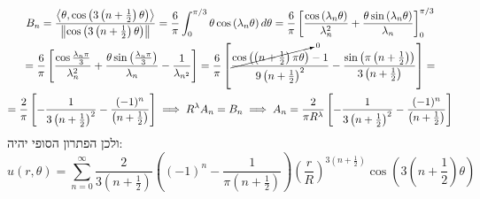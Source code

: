 \documentclass{tstextbook}
\begin{document}
\begin{gather*} B_{n}=\frac{\left\langle  \theta, \cos \left( 3\left( n+\frac{1}{2} \right)\theta \right)  \right\rangle }{\left\lVert   \cos \left( 3\left( n+\frac{1}{2} \right)\theta  \right)  \right\rVert }= \frac{6}{\pi}\int_{0}^{\pi/3}\theta \cos\left( \lambda_{n}\theta \right)d\theta= \frac{6}{\pi}\left[ \frac{\cos\left( \lambda_{n} \theta \right)}{\lambda_{n}^2}+\frac{\theta \sin\left( \lambda_{n} \theta \right)}{\lambda_{n}} \right]_{0}^{\pi/3} \\=\frac{6}{\pi}\left[ \frac{\cos \frac{\lambda_{n}\pi}{3}}{\lambda_{n}^2}+\frac{\theta \sin\left( \frac{\lambda_{n}\pi}{3} \right)}{\lambda_{n}} -\frac{1}{\lambda_{n^2}}\right]=  \frac{6}{\pi}\left[ \frac{\cancelto{ 0 }{ \cos\left( \left( n+\frac{1}{2} \right)\pi \theta \right) }-1}{9\left(n+\frac{1}{2} \right)^2}-\frac{\sin\left( \pi\left( n+\frac{1}{2} \right) \right)}{3\left( n+\frac{1}{2} \right)} \right]= \\
=\frac{2}{\pi}\left[ -\frac{1}{3\left( n+\frac{1}{2} \right)^2}-\frac{(-1)^n}{\left( n+\frac{1}{2} \right)}  \right]\implies R^\lambda A_{n}=B_{n}\implies A_{n}=\frac{2}{\pi R^\lambda}\left[ -\frac{1}{3\left( n+\frac{1}{2} \right)^2}-\frac{(-1)^n}{\left( n+\frac{1}{2} \right)}  \right]\end{gather*}
ולכן הפתרון הסופי יהיה:
$$u\left(r,\theta\right)=\sum_{n=0}^{\infty}{\frac{2}{3\left(n+{\frac{1}{2}}\right)}}\left(\left(-1\right)^{n}-{\frac{1}{\pi\left(n+{\frac{1}{2}}\right)}}\right)\left({\frac{r}{R}}\right)^{3\left(n+{\frac{1}{2}}\right)}\cos\left(3\left(n+{\frac{1}{2}}\right)\theta\right)$$
\end{document}
